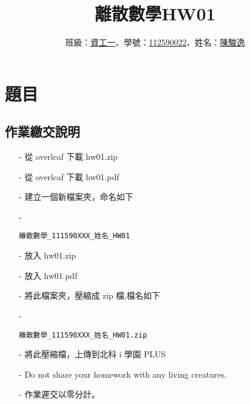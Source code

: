 \documentclass[sigconf]{acmart}
\begin{document}
\title{離散數學HW01}

\author{班級：\underline{資工一}、學號：\underline{112590022}、姓名：\underline{陳駿逸}}
\orcid{}
\affiliation{%
  \institution{}
  \city{}
  \country{}
}

\renewcommand\footnotetextcopyrightpermission[1]{} %
\pagestyle{plain} %

\maketitle


\section{題目}
\subsection{作業繳交說明}
\begin{shaded}
\begin{itemize}
    \item[-] 從 overleaf 下載 hw01.zip
    \item[-] 從 overleaf 下載 hw01.pdf
    \item[-] 建立一個新檔案夾，命名如下
    \item[-] \color{red}\begin{verbatim}離散數學_111590XXX_姓名_HW01\end{verbatim}\color{black}
    \item[-] 放入 hw01.zip
    \item[-] 放入 hw01.pdf
    \item[-] 將此檔案夾，壓縮成 zip 檔,檔名如下
    \item[-] \color{red}\begin{verbatim}離散數學_111590XXX_姓名_HW01.zip\end{verbatim}\color{black}
    \item[-] 將此壓縮檔，上傳到北科 i 學園 PLUS
    \item[-] Do not share your homework with any living creatures.
    \item[-] 作業遲交以零分計。
\end{itemize}
\end{shaded}

\end{document}
